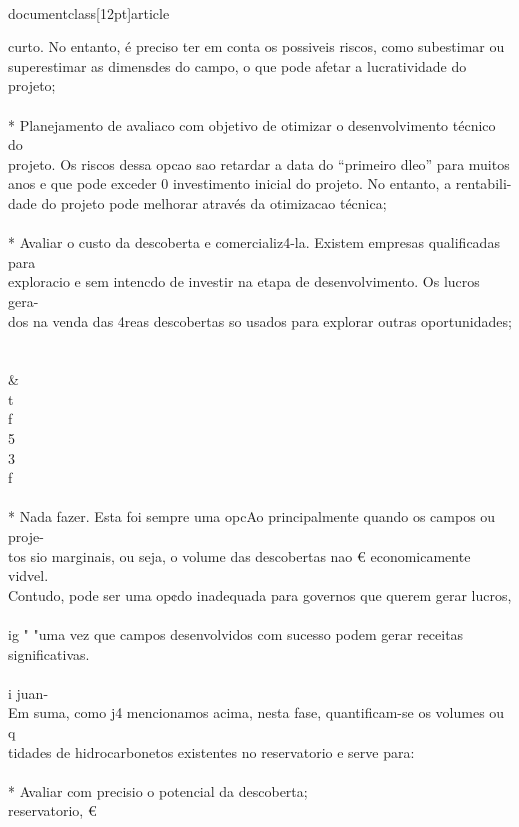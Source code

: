 \\documentclass[12pt]{article}
\begin{document}
curto. No entanto, é preciso ter em conta os possiveis riscos, como subestimar ou\\
superestimar as dimensdes do campo, o que pode afetar a lucratividade do projeto;\\
\\
* Planejamento de avaliaco com objetivo de otimizar o desenvolvimento técnico do\\
projeto. Os riscos dessa opcao sao retardar a data do “primeiro dleo” para muitos\\
anos e que pode exceder 0 investimento inicial do projeto. No entanto, a rentabili-\\
dade do projeto pode melhorar através da otimizacao técnica;\\
\\
* Avaliar o custo da descoberta e comercializ4-la. Existem empresas qualificadas para\\
exploracio e sem intencdo de investir na etapa de desenvolvimento. Os lucros gera-\\
dos na venda das 4reas descobertas so usados para explorar outras oportunidades;\\
\\
\\&\\
t\\
f\\
5\\
3\\
f\\
\\
* Nada fazer. Esta foi sempre uma opcAo principalmente quando os campos ou proje-\\
tos sio marginais, ou seja, o volume das descobertas nao € economicamente vidvel.\\
Contudo, pode ser uma op¢do inadequada para governos que querem gerar lucros,\\
\\
ig " "uma vez que campos desenvolvidos com sucesso podem gerar receitas significativas.\\
\\
i juan-\\
Em suma, como j4 mencionamos acima, nesta fase, quantificam-se os volumes ou q\\
tidades de hidrocarbonetos existentes no reservatorio e serve para:\\
\\
* Avaliar com precisio o potencial da descoberta;\\
reservatorio, €\\
\end{document}
